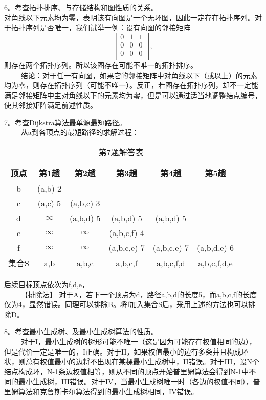 6。考查拓扑排序、与存储结构和图性质的关系。\\
对角线以下元素均为零，表明该有向图是一个无环图，因此一定存在拓扑序列。对于拓扑序列是否唯一，我们试举一例：设有向图的邻接矩阵
\begin{equation}
\begin{bmatrix}
 0 & 1 & 1 \\
 0 & 0 & 0 \\
 0 & 0 & 0 \\
\end{bmatrix},
\end{equation}
则存在两个拓扑序列。所以该图存在可能不唯一的拓扑排序。\\
$\qquad$ 结论：对于任一有向图，如果它的邻接矩阵中对角线以下（或以上）的元素均为零，则存在拓扑序列（可能不唯一）。反正，若图存在拓扑序列，却不一定能满足邻接矩阵中主对角线以下的元素均为零，但是可以通过适当地调整结点编号，使其邻接矩阵满足前述性质。

7。考查Dijkstra算法最单源最短路径。\\
$\qquad$ 从a到各顶点的最短路径的求解过程：\\
\begin{table}[ht]
\centering
\caption{第7题解答表}\label{tab_CSN12_5}
\begin{tabular}{|c|c|c|c|c|c|}
\hline
顶点 & 第1趟 & 第2趟 & 第3趟 & 第4趟 & 第5趟 \\
\hline
b & (a,b) 2 &  &  &  &  \\
\hline
c & (a,c) 5 & (a,b,c) 3 &  &  &  \\
\hline
d & $\infty$ & (a,b,d) 5 & (a,b,d) 5 & (a,b,d) 5 &  \\
\hline
e & $\infty$ & $\infty$ & (a,b,c,f) 4 &  &  \\
\hline
f & $\infty$  & $\infty$ & (a,b,c,e) 7 & (a,b,c,e) 7 & (a,b,d,e) 6 \\
\hline
集合S & {a,b} & {a,b,c} & {a,b,c,f} & {a,b,c,f,d} & {a,b,c,f,d,e} \\
\hline
\end{tabular}
\end{table}
后续目标顶点依次为f,d,e， \\
$\qquad$ 【排除法】 对于A，若下一个顶点为d，路径a,b,d的长度5，而a,b,c,f的长度仅为4，显然错误。同理可以排除B。将f加入集合S后，采用上述的方法也可以排除D。

8。考查最小生成树、及最小生成树算法的性质。\\
$\qquad$ 对于I，最小生成树的树形可能不唯一（这是因为可能存在权值相同的边），但是代价一定是唯一的，I正确。对于II，如果权值最小的边有多条并且构成环状，则总有权值最小的边将不出现在某棵最小生成树中，II错误。对于III，设N个结点构成环，N-1条边权值相等，则从不同的顶点开始普里姆算法会得到N-1中不同的最小生成树，III错误。对于IV，当最小生成树唯一时（各边的权值不同），普里姆算法和克鲁斯卡尔算法得到的最小生成树相同，IV错误。

